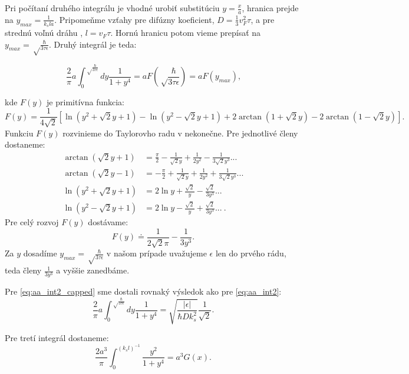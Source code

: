 Pri počítaní druhého integrálu je vhodné urobiť substitúciu $y=\frac{x}{a}$, hranica prejde na $y_{max}=\frac{1}{k_sla}$.
Pripomeňme vzťahy pre difúzny koeficient, $D=\frac{1}{3}v_F^2 \tau$, a pre strednú voľnú dráhu , $l=v_F \tau$.
Hornú hranicu potom vieme prepísať na $y_{max}=\sqrt\frac{\hbar}{3\tau \epsilon}$. Druhý integrál je teda:

\begin{equation}
 \label{eq:aa_int2_capped}
 \frac{2}{\pi}a\int_0^{\sqrt\frac{\hbar}{3\tau \epsilon}} dy \frac{1}{1+y^4}=aF(\sqrt\frac{\hbar}{3\tau \epsilon})=aF(y_{max})\text{,}
\end{equation}

kde $F(y)$ je primitívna funkcia:
\begin{equation}
 \label{eq:aa_primitive_func}
 F(y)=\frac{1}{4\sqrt 2}[ \ln(y^2+\sqrt 2 y+1)-\ln(y^2-\sqrt 2 y+1) + 2\arctan(1+\sqrt 2 y ) - 2\arctan(1-\sqrt 2 y)]\text{.}
\end{equation}
Funkciu $F(y)$ rozvinieme do Taylorovho radu v nekonečne. Pre jednotlivé členy dostaneme:
\begin{align*}
 \arctan(\sqrt 2 y+1)&=\frac{\pi}{2}-\frac{1}{\sqrt 2 y}+\frac{1}{2 y^2}-\frac{1}{3 \sqrt 2 y^3} ... \\
 \arctan(\sqrt 2 y -1)&= -\frac{\pi}{2}+\frac{1}{\sqrt 2 y}+\frac{1}{2 y^2}+\frac{1}{3 \sqrt 2 y^3} ...\\
 \ln(y^2+\sqrt 2 y+1)&=  2 \ln y + \frac{\sqrt 2} {y}-\frac{\sqrt 2}{3y^3} ...\\
 \ln(y^2-\sqrt 2 y+1)&= 2 \ln y - \frac{\sqrt 2} {y}+\frac{\sqrt 2}{3y^3}...\ \text{.}
\end{align*}
Pre celý rozvoj $F(y)$ dostávame:
\begin{equation}
 \label{eq:aa_primitive_func_taylor}
F(y)\doteq \frac{1}{2\sqrt2\pi} - \frac{1}{3y^3}\text{.}
\end{equation}
Za $y$ dosadíme $y_{max}=\sqrt\frac{\hbar}{3\tau \epsilon}$ v našom prípade uvažujeme $\epsilon$ len do prvého rádu,
teda členy $\frac{1}{3y^3}$ a vyššie zanedbáme.

Pre \eqref{eq:aa_int2_capped} sme dostali rovnaký výsledok  ako pre \eqref{eq:aa_int2}:
\begin{equation}
 \label{eq:aa_int2_capped_final}
  \frac{2}{\pi}a\int_0^{\sqrt\frac{\hbar}{3\tau \epsilon}} dy \frac{1}{1+y^4}=\sqrt{\frac{|\epsilon|}{\hbar D k_s^2}} \frac{1}{\sqrt{2}}\text{.}
\end{equation}

 Pre tretí integrál dostaneme:
 \begin{equation}
  \label{eq:aa_int3_capped}
  \frac{2a^3}{\pi}\int_0^{(k_sl)^{-1}}\frac{y^2}{1+y^4}=a^3G(x)\text{.}
 \end{equation}


